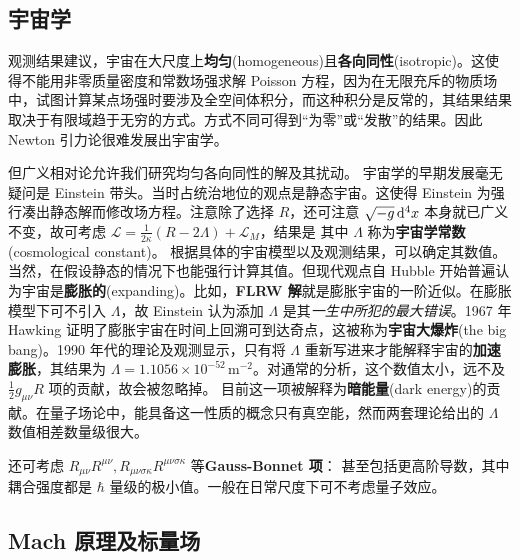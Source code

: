 \subsection{宇宙学}
观测结果建议，宇宙在大尺度上\textbf{均匀}(homogeneous)且\textbf{各向同性}(isotropic)。这使得不能用非零质量密度和常数场强求解 Poisson 方程，因为在无限充斥的物质场中，试图计算某点场强时要涉及全空间体积分，而这种积分是反常的，其结果结果取决于有限域趋于无穷的方式。方式不同可得到“为零”或“发散”的结果。因此 Newton 引力论很难发展出宇宙学。

但广义相对论允许我们研究均匀各向同性的解及其扰动。
宇宙学的早期发展毫无疑问是 Einstein 带头。当时占统治地位的观点是静态宇宙。这使得 Einstein 为强行凑出静态解而修改场方程。注意除了选择 $R$，还可注意 $\sqrt{-g}\dd[4]{x}$ 本身就已广义不变，故可考虑 $\mathcal L=\frac{1}{2\kappa}\left(R-2\Lambda\right)+\mathcal L_M$，结果是
其中 $\Lambda$ 称为\textbf{宇宙学常数}(cosmological constant)。
根据具体的宇宙模型以及观测结果，可以确定其数值。
当然，在假设静态的情况下也能强行计算其值。但现代观点自 Hubble 开始普遍认为宇宙是\textbf{膨胀的}(expanding)。比如，\textbf{FLRW 解}就是膨胀宇宙的一阶近似。在膨胀模型下可不引入 $\Lambda$，故 Einstein 认为添加 $\Lambda$ 是其\textit{一生中所犯的最大错误}。1967 年 Hawking 证明了膨胀宇宙在时间上回溯可到达奇点，这被称为\textbf{宇宙大爆炸}(the big bang)。1990 年代的理论及观测显示，只有将 $\Lambda$ 重新写进来才能解释宇宙的\textbf{加速膨胀}，其结果为 $\Lambda=1.1056\times 10^{-52}$\,m$^{-2}$。对通常的分析，这个数值太小，远不及 $\frac12 g_{\mu\nu} R$ 项的贡献，故会被忽略掉。
目前这一项被解释为\textbf{暗能量}(dark energy)的贡献。在量子场论中，能具备这一性质的概念只有真空能，然而两套理论给出的 $\Lambda$ 数值相差数量级很大。

还可考虑 $R_{\mu\nu} R^{\mu\nu},R_{\mu\nu\sigma\kappa}R^{\mu\nu\sigma\kappa}$ 等\textbf{Gauss-Bonnet 项}：
甚至包括更高阶导数，其中耦合强度都是 $\hbar$ 量级的极小值。一般在日常尺度下可不考虑量子效应。

\subsection{Mach 原理及标量场}

